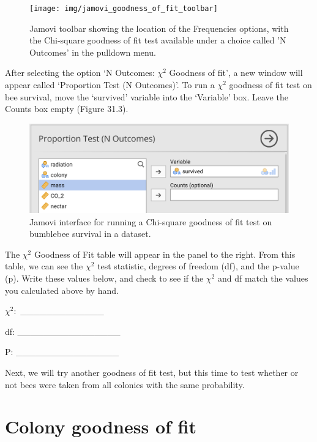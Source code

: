 \documentclass[
]{scrbook}
\begin{document}
\begin{figure}
\texttt{[image: img/jamovi\_goodness\_of\_fit\_toolbar]} \caption{Jamovi toolbar showing the location of the Frequencies options, with the Chi-square goodness of fit test available under a choice called 'N Outcomes' in the pulldown menu.}\label{fig:unnamed-chunk-152}
\end{figure}

After selecting the option `N Outcomes: \(\chi^{2}\) Goodness of fit', a new window will appear called `Proportion Test (N Outcomes)'.
To run a \(\chi^{2}\) goodness of fit test on bee survival, move the `survived' variable into the `Variable' box.
Leave the Counts box empty (Figure 31.3).

\begin{figure}
\includegraphics[width=1\linewidth]{img/jamovi_goodness_of_fit_interface} \caption{Jamovi interface for running a Chi-square goodness of fit test on bumblebee survival in a dataset.}\label{fig:unnamed-chunk-153}
\end{figure}

The \(\chi^{2}\) Goodness of Fit table will appear in the panel to the right.
From this table, we can see the \(\chi^{2}\) test statistic, degrees of freedom (df), and the p-value (p).
Write these values below, and check to see if the \(\chi^{2}\) and df match the values you calculated above by hand.

\(\chi^{2}:\) \_\_\_\_\_\_\_\_\_\_\_\_\_

df: \_\_\_\_\_\_\_\_\_\_\_\_\_\_\_\_

P: \_\_\_\_\_\_\_\_\_\_\_\_\_\_\_\_

Next, we will try another goodness of fit test, but this time to test whether or not bees were taken from all colonies with the same probability.

\hypertarget{colony-goodness-of-fit}{%
\section{Colony goodness of fit}\label{colony-goodness-of-fit}}
\end{document}
